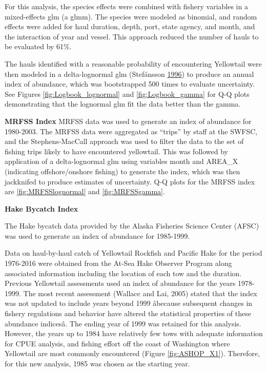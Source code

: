 \documentclass[12pt,]{article}
\begin{document}
For this analysis, the species effects were combined with fishery
variables in a mixed-effects glm (a glmm). The species were modeled as
binomial, and random effects were added for haul duration, depth, port,
state agency, and month, and the interaction of year and vessel. This
approach reduced the number of hauls to be evaluated by 61\%.

The hauls identified with a reasonable probability of encountering
Yellowtail were then modeled in a delta-lognormal glm (Stefánsson
\protect\hyperlink{ref-Stefansson1996}{1996}) to produce an annual index
of abundance, which was bootstrapped 500 times to evaluate uncertainty.
See Figures \ref{fig:Logbook_lognormal} and \ref{fig:Logbook_gamma} for
Q-Q plots demonstrating that the lognormal glm fit the data better than
the gamma.

\textbf{MRFSS Index} MRFSS data was used to generate an index of
abundance for 1980-2003. The MRFSS data were aggregated as ``trips'' by
staff at the SWFSC, and the Stephens-MacCall approach was used to filter
the data to the set of fishing trips likely to have encountered
yellowtail. This was followed by application of a delta-lognormal glm
using variables month and AREA\_X (indicating offshore/onshore fishing)
to generate the index, which was then jackknifed to produce estimates of
uncertainty. Q-Q plots for the MRFSS index are \ref{fig:MRFSSlognormal}
and \ref{fig:MRFSSgamma}.

\textbf{Hake Bycatch Index}

The Hake bycatch data provided by the Alaska Fisheries Science Center
(AFSC) was used to generate an index of abundance for 1985-1999.

Data on haul-by-haul catch of Yellowtail Rockfish and Pacific Hake for
the period 1976-2016 were obtained from the At-Sea Hake Observer Program
along associated information including the location of each tow and the
duration. Previous Yellowtail assessments used an index of abundance for
the years 1978-1999. The most recent assessment (Wallace and Lai, 2005)
stated that the index was not updated to include years beyond 1999
âbecause subsequent changes in fishery regulations and behavior have
altered the statistical properties of these abundance indicesâ. The
ending year of 1999 was retained for this analysis. However, the years
up to 1984 have relatively few tows with adequate information for CPUE
analysis, and fishing effort off the coast of Washington where
Yellowtail are most commonly encountered (Figure \ref{fig:ASHOP_X1}).
Therefore, for this new analysis, 1985 was chosen as the starting year.
\end{document}
